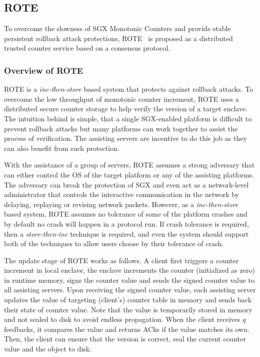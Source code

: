 \subsection{ROTE}

To overcome the slowness of SGX Monotonic Counters and provide stable persistent 
rollback attack protections, ROTE~\cite{} is proposed as a distributed trusted 
counter service based on a consensus protocol.

\subsubsection{Overview of ROTE}
\label{overview_rote}
ROTE is a \textit{inc-then-store} based system that protects against rollback attacks.
To overcome the low throughput of monotonic counter increment, ROTE uses a distributed 
secure counter storage to help verify the version of a target enclave. The intuition 
behind is simple, that a single SGX-enabled platform is difficult to prevent rollback
attacks but many platforms can work together to assist the process of verification.
The assisting servers are incentive to do this job as they can also benefit from 
such protection.

With the assistance of a group of servers, ROTE assumes a strong adversary  
that can either control the OS of the target platform or any of the assisting platforms.
The adversary can break the protection of SGX and even act as a network-level administrator
that controls the interactive communication in the network by delaying, replaying or 
revising network packets. However, as a \textit{inc-then-store} based system, ROTE 
assumes no tolerance of some of the platform crashes and by default no crash will happen
in a protocol run. If crash tolerance is required, then a \textit{store-then-inc}
technique is required, and even the system should support both of the techniques to 
allow users choose by their tolerance of crash.

The update stage of ROTE works as follows. A client first triggers a counter increment 
in local enclave, the enclave increments the counter (initialized as zero) in runtime
memory, signs the counter value and sends the signed counter value to all assisting 
servers. Upon receiving the signed counter value, each assisting server updates the 
value of targeting (client's) counter table in memory and sends back their state 
of counter value. Note that the value is temporarily stored in memory 
and not sealed to disk to avoid endless propagation. When the client receives $q$
feedbacks, it compares the value and returns ACks if the value matches its own.
Then, the client can ensure that the version is correct, seal the current counter 
value and the object to disk. 

